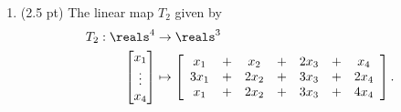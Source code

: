 \begin{enumerate}[resume,label=(\alph*)]
\item\label{itm : Quiz17b} (2.5 pt) The linear map $T_{2}$ given by
\begin{align*}
T_{2}
:
\reals^{4}
&\rightarrow
\reals^{3}
\\
\begin{bmatrix}
x_{1}		\\
\vdots	\\
x_{4}
\end{bmatrix}
&\mapsto
\left[
\begin{array}{c c c c c c c}
x_{1}		&	+	&	x_{2}		&	+	&	2 x_{3}	&	+	&	x_{4}		\\
3 x_{1}	&	+	&	2 x_{2}	&	+	&	3 x_{3}	&	+	&	2 x_{4}	\\
x_{1}		&	+	&	2 x_{2}	&	+	&	3 x_{3}	&	+	&	4 x_{4}
\end{array}
\right].
\end{align*}
\end{enumerate}

